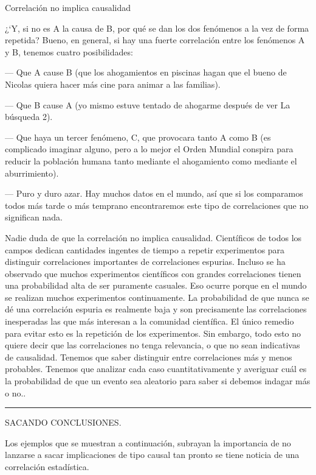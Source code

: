 \begin{myexampleblock}{Correlación no implica causalidad}
\begin{small}
\vspace{2mm} ¿`Y, si no es A la causa de B, por qué se dan los dos fenómenos a la vez de forma repetida? Bueno, en general, si hay una fuerte correlación entre los fenómenos A y B, tenemos cuatro posibilidades:

\begin{adjustwidth}{20pt}{5pt}
\textcolor{gris}{--- Que A cause B (que los ahogamientos en piscinas hagan que el bueno de Nicolas quiera hacer más cine para animar a las familias).}

\textcolor{gris}{--- Que B cause A (yo mismo estuve tentado de ahogarme después de ver La búsqueda 2).}

\textcolor{gris}{--- Que haya un tercer fenómeno, C, que provocara tanto A como B (es complicado imaginar alguno, pero a lo mejor el Orden Mundial conspira para reducir la población humana tanto mediante el ahogamiento como mediante el aburrimiento).}

\textcolor{gris}{--- Puro y duro azar. Hay muchos datos en el mundo, así que si los comparamos todos más tarde o más temprano encontraremos este tipo de correlaciones que no significan nada.}
\end{adjustwidth}

\vspace{2mm} Nadie duda de que la correlación no implica causalidad. Científicos de todos los campos dedican cantidades ingentes de tiempo a repetir experimentos para distinguir correlaciones importantes de correlaciones espurias. Incluso se ha observado que muchos experimentos científicos con grandes correlaciones tienen una probabilidad alta de ser puramente casuales. Eso ocurre porque en el mundo se realizan muchos experimentos continuamente. La probabilidad de que nunca se dé una correlación espuria es realmente baja y son precisamente las correlaciones inesperadas las que más interesan a la comunidad científica. El único remedio para evitar esto es la repetición de los experimentos. Sin embargo, todo esto no quiere decir que las correlaciones no tenga relevancia, o que no sean indicativas de causalidad. Tenemos que saber distinguir entre correlaciones más y menos probables. Tenemos que analizar cada caso cuantitativamente y averiguar cuál es la probabilidad de que un evento sea aleatorio para saber si debemos indagar más o no..


\rule{65mm}{0.1mm}

SACANDO CONCLUSIONES.
 
\vspace{2mm} Los ejemplos que se muestran a continuación, subrayan la importancia de no lanzarse a sacar implicaciones de tipo causal tan pronto se tiene noticia de una correlación estadística. 


\end{small}
\end{myexampleblock}
